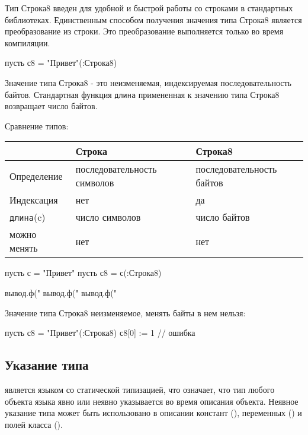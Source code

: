 Тип Строка8 введен для удобной и быстрой работы со строками в стандартных библиотеках. 
Единственным способом получения значения типа Строка8 является преобразование из строки. 
Это преобразование выполняется только во время компиляции.

\begin{Trivil}
пусть с8 = "Привет"(:Строка8)
\end{Trivil}

Значение типа Строка8 - это неизменяемая, индексируемая последовательность байтов.
Стандартная функция \verb+длина+ примененная к значению типа Строка8 возвращает число байтов.

\bigskip
Сравнение типов:

\bigskip
\begin{tabular}[c]{l|p{3.5cm}|p{3.5cm}}
& \textbf{Строка} & \textbf{Строка8}  \\ 
\hline
Определение &  последовательность символов & последовательность байтов \\
Индексация & нет & да \\
\verb+длина+(c) & число символов & число байтов \\
можно менять & нет & нет \\
\hline
\end{tabular}

\begin{Trivil}
пусть с = "Привет"
пусть с8 = с(:Строка8)

вывод.ф("%
вывод.ф("%
вывод.ф("%
\end{Trivil}

Значение типа Строка8 неизменяемое, менять байты в нем нельзя:
\begin{SampleErr}[vspace=2pt]
    пусть с8 = "Привет"(:Строка8)
    с8[0] := 1 // ошибка
\end{SampleErr}

\hypertarget{type-ref}{%
\subsection{Указание типа}\label{decls:type-ref}}

\thelang{} является языком со статической типизацией, что означает, что тип любого объекта языка явно или неявно указывается во время описания объекта. 
Неявное указание типа может быть использовано в описании констант (), переменных () и полей класса ().

